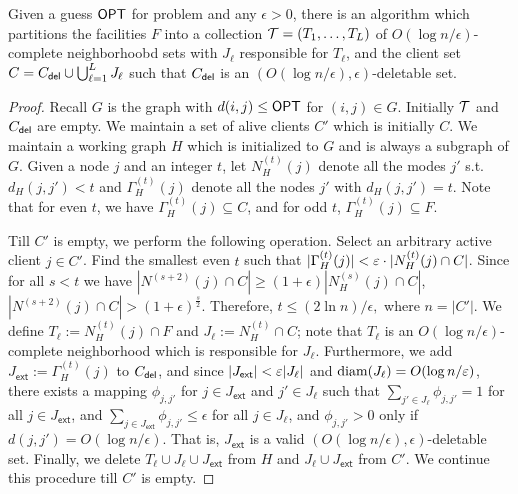 \begin{theorem}\label{fthm:weakdecomp}
	Given a guess $\mathsf{OPT}$ for \mckc problem and any $\epsilon>0$,  there is an algorithm which partitions the facilities $F$ into a collection ${\cal T} = (T_1,\ldots,T_L)$ of
	$O(\log n/\epsilon)$-complete neighborhoobd sets with $J_\ell$ responsible for $T_\ell$, and the client set $C = C_{\mathsf{del}} \cup \bigcup_{\ell=1}^L J_\ell$ such that
	$C_{\mathsf{del}}$ is an $(O(\log n/\epsilon),\epsilon)$-deletable set.
\end{theorem}
\begin{proof}
Recall $G$ is the graph with $d(i,j) \leq \mathsf{OPT}$ for $(i,j)\in G$. %
	Initially ${\cal T}$ and $C_{\mathsf{del}}$ are empty. We maintain a set of alive clients $C'$ which is initially $C$. We maintain a working graph $H$ which is initialized to $G$ and is always a subgraph of $G$.
	Given a node $j$ and an integer $t$, let $N^{(t)}_H(j)$ denote all the modes $j'$ s.t. $d_H(j,j') < t$ and $\Gamma^{(t)}_H(j)$ denote all the nodes $j'$ with $d_H(j,j')  = t$.
	Note that for even $t$, we have $\Gamma^{(t)}_H(j) \subseteq C$, and for odd $t$, $\Gamma^{(t)}_H(j) \subseteq F$.
	\smallskip
	
	
	Till $C'$ is empty, we perform the following operation.
	Select an arbitrary active client $j\in C'$. Find the smallest even $t$ such that $|\Gamma^{(t)}_H(j)| < \varepsilon\cdot |N^{(t)}_H(j)\cap C|$. Since for all $s < t$ we have $|N^{(s+2)}(j)\cap C|\geq (1+\epsilon)|N^{(s)}_H(j)\cap C|$,  $|N^{(s+2)}(j)\cap C| > (1+\epsilon)^{\frac{s}{2}}$. Therefore,  $t \leq (2\ln n)/\epsilon,$ where $n=|C'|$. %
	We define $T_\ell := N^{(t)}_H(j) \cap F$ and $J_\ell := N^{(t)}_H \cap C$; note that $T_\ell$ is an $O(\log n/\epsilon)$-complete neighborhood which is responsible for $J_\ell$. Furthermore, we add $J_\mathsf{ext} := \Gamma^{(t)}_H(j)$ to $C_{\mathsf{del}}$, and since
	$|J_\mathsf{ext}| < \varepsilon |J_\ell|$ and $\mathrm{diam}(J_\ell) = O(\log n/\varepsilon)$, there exists a mapping $\phi_{j,j'}$ for $j\in J_\mathsf{ext}$ and $j'\in J_\ell$ such that $\sum_{j'\in J_\ell} \phi_{j,j'} = 1$ for all $j\in J_\mathsf{ext}$, and
	$\sum_{j\in J_\mathsf{ext}} \phi_{j,j'} \leq \epsilon$ for all $j\in J_\ell$, and $\phi_{j,j'} > 0$ only if $d(j,j') = O(\log n/\epsilon)$. That is, $J_\mathsf{ext}$ is a valid $(O(\log n/\epsilon),\epsilon)$-deletable set.
	Finally, we delete $T_\ell \cup J_\ell \cup J_\mathsf{ext}$ from $H$ and $J_\ell \cup J_\mathsf{ext}$ from $C'$. We continue this procedure till $C'$ is empty. \end{proof}
